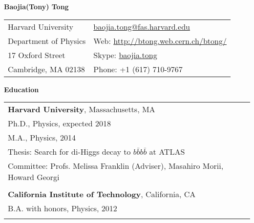 \documentclass[letterpaper,11pt,oneside]{article}
\newcommand*{\Skype}{\href{skype:baojia.tong?add}{baojia.tong}}
\newcommand{\Absender}[1][\normalsize]{\Skype}
\newcommand{\blue}[1]{\textcolor[rgb]{0,0,0.9}{#1}}
\begin{document}

\noindent  \center \LARGE{\textbf{Baojia(Tony) Tong}}  \\
\vspace{1cm}
\normalsize
\begin{center}
\begin{tabular}{l l}
 Harvard University           & \hspace{1in} \href{mailto:baojia.tong@fas.harvard.edu}{baojia.tong@fas.harvard.edu} \\
 Department of Physics    & \hspace{1in} Web: \blue{\href{http://btong.web.cern.ch/btong/}{http://btong.web.cern.ch/btong/}}   \\
 17 Oxford Street              & \hspace{1in} Skype: \Absender  \\
 Cambridge, MA 02138     & \hspace{1in} Phone: +1 (617) 710-9767 \\
\end{tabular}
\end{center}
\noindent\makebox[\linewidth]{\rule{0.8\paperwidth}{1.5pt}}
\raggedright
\normalsize
\begin{flushleft}
\textbf{\Large{Education}} \\
\vspace{0.5cm}
 \begin{tabular}{@{} l}
     \textbf{Harvard University}, Massachusetts, MA \\
     Ph.D., Physics, expected 2018 \\
     M.A., Physics, 2014 \\
     Thesis: Search for di-Higgs decay to $b\bar{b}b\bar{b}$ at ATLAS \\
     Committee: Profs. Melissa Franklin (Adviser), Masahiro Morii, Howard Georgi \\
     \\
     \textbf{California Institute of Technology}, California, CA \\
     B.A. with honors, Physics, 2012 \\
     \\
 \end{tabular}
\end{flushleft}
\end{document}
